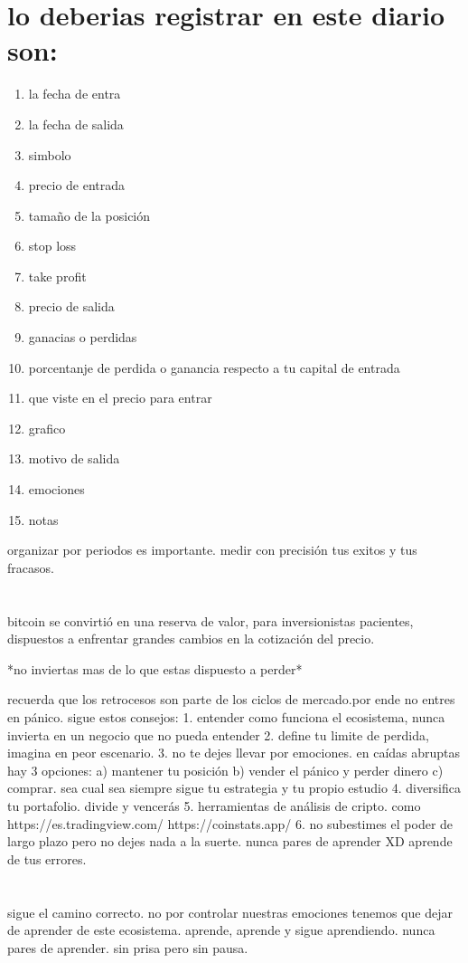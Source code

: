 \documentclass{article}
\begin{document}
    \section{lo deberias registrar en este diario son:}
    \begin{enumerate}
        \item la fecha de entra
        \item la fecha de salida
        \item simbolo
        \item precio de entrada
        \item tamaño de la posición
        \item stop loss
        \item take profit
        \item precio de salida
        \item ganacias o perdidas
        \item porcentanje de perdida o ganancia respecto a tu capital de entrada
        \item que viste en el precio para entrar
        \item grafico 
        \item motivo de salida 
        \item emociones
        \item notas 
    \end{enumerate}
    organizar por periodos es importante. medir con precisión tus exitos y tus fracasos.
    \section{}
    bitcoin se convirtió en una reserva de valor, para inversionistas pacientes, dispuestos a enfrentar grandes cambios en la cotización del precio.

*no inviertas mas de lo que estas dispuesto a perder*

recuerda que los retrocesos son parte de los ciclos de mercado.por ende no entres en pánico.
sigue estos consejos:
1. entender como funciona el ecosistema, nunca invierta en un negocio que no pueda entender
2. define tu limite de perdida, imagina en peor escenario.
3. no te dejes llevar por emociones. en caídas abruptas  hay 3 opciones:
	a)  mantener tu posición
	b) vender el pánico y perder dinero
	c) comprar.
sea cual sea siempre sigue tu estrategia  y tu propio estudio 
4. diversifica tu portafolio. divide y vencerás
5. herramientas de análisis de cripto. como https://es.tradingview.com/
https://coinstats.app/
6. no subestimes el poder de largo plazo pero no dejes nada a la suerte.
nunca pares de aprender XD aprende de tus errores.
    \section{}
    sigue el camino correcto.
no por controlar nuestras emociones tenemos que dejar de aprender de este ecosistema. aprende, aprende y sigue aprendiendo. nunca pares de aprender. sin prisa pero sin pausa.
    
\end{document}
